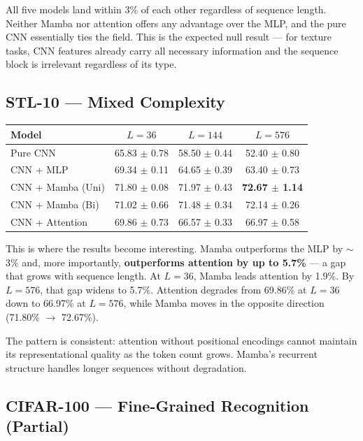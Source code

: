 \documentclass[11pt, a4paper]{article}
\begin{document}
All five models land within 3\% of each other regardless of sequence length.
Neither Mamba nor attention offers any advantage over the MLP, and the pure CNN
essentially ties the field. This is the expected null result — for texture tasks,
CNN features already carry all necessary information and the sequence block
is irrelevant regardless of its type.

\subsection{STL-10 — Mixed Complexity}

\begin{center}
\begin{tabular}{lccc}
\toprule
\textbf{Model} & $L=36$ & $L=144$ & $L=576$ \\
\midrule
Pure CNN          & 65.83 $\pm$ 0.78 & 58.50 $\pm$ 0.44 & 52.40 $\pm$ 0.80 \\
CNN + MLP         & 69.34 $\pm$ 0.11 & 64.65 $\pm$ 0.39 & 63.40 $\pm$ 0.73 \\
CNN + Mamba (Uni) & 71.80 $\pm$ 0.08 & 71.97 $\pm$ 0.43 & \textbf{72.67 $\pm$ 1.14} \\
CNN + Mamba (Bi)  & 71.02 $\pm$ 0.66 & 71.48 $\pm$ 0.34 & 72.14 $\pm$ 0.26 \\
CNN + Attention   & 69.86 $\pm$ 0.73 & 66.57 $\pm$ 0.33 & 66.97 $\pm$ 0.58 \\
\bottomrule
\end{tabular}
\end{center}

This is where the results become interesting. Mamba outperforms the MLP by $\sim$3\%
and, more importantly, \textbf{outperforms attention by up to 5.7\%} — a gap that
grows with sequence length. At $L=36$, Mamba leads attention by 1.9\%. By $L=576$,
that gap widens to 5.7\%. Attention degrades from 69.86\% at $L=36$ down to 66.97\%
at $L=576$, while Mamba moves in the opposite direction (71.80\% $\to$ 72.67\%).

The pattern is consistent: attention without positional encodings cannot maintain
its representational quality as the token count grows. Mamba's recurrent structure
handles longer sequences without degradation.

\subsection{CIFAR-100 — Fine-Grained Recognition (Partial)}
\end{document}
